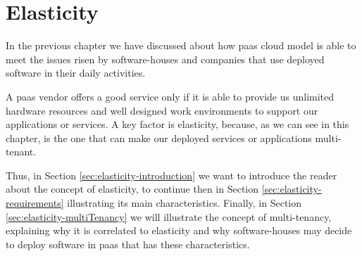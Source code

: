 %
%
\chapter{Elasticity}
\label{cap:elasticity}
In the previous chapter we have discussed about how \ac{paas} cloud model is able to meet the issues risen
by software-houses and companies that use deployed software in their daily activities.

A \ac{paas} vendor offers a good service only if it is able to provide us unlimited hardware resources and
well designed work environments to support our applications or services. A key factor is elasticity, because,
as we can see in this chapter, is the one that can make our deployed services or applications multi-tenant.

Thus, in Section \ref{sec:elasticity-introduction} we want to introduce the reader about the concept of
elasticity, to continue then in Section \ref{sec:elasticity-requirements} illustrating its main
characteristics. Finally, in Section \ref{sec:elasticity-multiTenancy} we will illustrate the concept of
multi-tenancy, explaining why it is correlated to elasticity and why software-houses may
decide to deploy software in \ac{paas} that has these characteristics.







